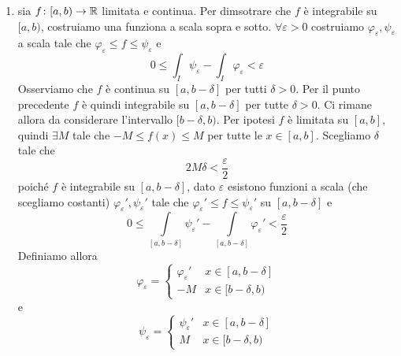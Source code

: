 \documentclass[a4paper]{article}
\begin{document}
\begin{snippetproof}{}
\begin{enumerate}
\begin{enumerate}
\[\begin{cases}
                    f(x) & x \in [a,b] \\
                    L & x = b
                \end{cases}
            \]
            \(\overline{f}\) è monotona su \([a,b]\)
            e quindi ivi integrabile e quindi \(\overline{f} = f\) è integrabile
            nel sottoinsieme \([a,b)\).
            \item sia \(f\colon [a,b) \to \mathbb{R}\) limitata e continua.
            Per dimsotrare che \(f\) è integrabile su \([a,b)\),
            costruiamo una funziona a scala sopra e sotto. \(\forall \varepsilon > 0\)
            costruiamo \(\varphi_\varepsilon, \psi_\varepsilon\) a scala tale che \(\varphi_\varepsilon \leq f \leq \psi_\varepsilon\)
            e
            \[
                0 \leq \int_I \psi_\varepsilon - \int_I \varphi_\varepsilon < \varepsilon
            \]
            Osserviamo che \(f\) è continua su \([a,b-\delta]\) per tutti \(\delta > 0\).
            Per il punto precedente \(f\) è quindi integrabile su
            \([a,b-\delta]\) per tutte \(\delta>0\).
            Ci rimane allora da considerare l'intervallo \([b-\delta, b)\).
            Per ipotesi \(f\) è limitata su \([a,b]\), quindi \(\exists M\)
            tale che \(-M \leq f(x) \leq M\) per tutte le \(x\in [a,b]\).
            Scegliamo \(\delta\) tale che
            \[
                2M\delta < \frac{\varepsilon}{2}
            \]
            poiché \(f\) è integrabile su \([a,b-\delta]\), dato \(\varepsilon\) esistono
            funzioni a scala (che scegliamo costanti)
            \(\varphi_\varepsilon', \psi_\varepsilon'\) tale che \(\varphi_\varepsilon' \leq f \leq \psi_\varepsilon'\)
            su \([a,b-\delta]\) e
            \[
                0 \leq \int\limits_{[a,b-\delta]} \psi_\varepsilon' - \int\limits_{[a,b-\delta]} \varphi_\varepsilon' < \frac{\varepsilon}{2}
            \]
            Definiamo allora
            \[
                \varphi_\varepsilon = \begin{cases}
                    \varphi_\varepsilon' & x\in[a,b-\delta] \\
                    -M & x\in [b-\delta, b)
                \end{cases}
            \]
            e
            \[
                \psi_\varepsilon = \begin{cases}
                    \psi_\varepsilon' & x\in[a,b-\delta] \\
                    M & x\in [b-\delta, b)
                \end{cases}
\]
\end{enumerate}
\end{enumerate}
\end{snippetproof}
\end{document}
